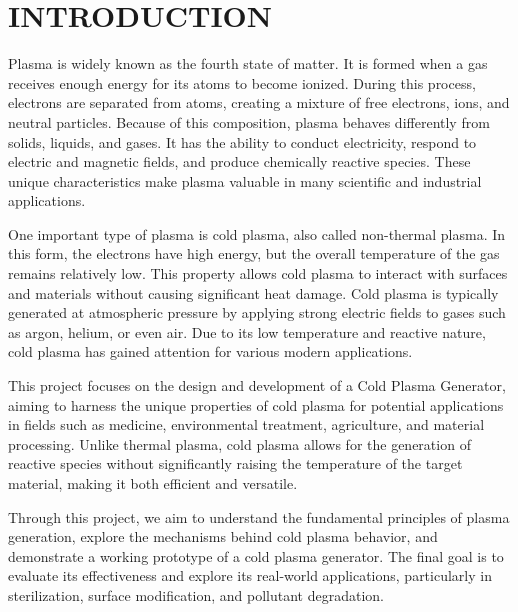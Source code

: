 \chapter{INTRODUCTION}\label{chap-intro}
\thispagestyle{empty}

\hspace{1cm} Plasma is widely known as the fourth state of matter. It is formed when a gas receives enough energy for its atoms to become ionized. During this process, electrons are separated from atoms, creating a mixture of free electrons, ions, and neutral particles. Because of this composition, plasma behaves differently from solids, liquids, and gases. It has the ability to conduct electricity, respond to electric and magnetic fields, and produce chemically reactive species. These unique characteristics make plasma valuable in many scientific and industrial applications.

One important type of plasma is cold plasma, also called non-thermal plasma. In this form, the electrons have high energy, but the overall temperature of the gas remains relatively low. This property allows cold plasma to interact with surfaces and materials without causing significant heat damage. Cold plasma is typically generated at atmospheric pressure by applying strong electric fields to gases such as argon, helium, or even air. Due to its low temperature and reactive nature, cold plasma has gained attention for various modern applications.

This project focuses on the design and development of a Cold Plasma Generator, aiming to harness the unique properties of cold plasma for potential applications in fields such as medicine, environmental treatment, agriculture, and material processing. Unlike thermal plasma, cold plasma allows for the generation of reactive species without significantly raising the temperature of the target material, making it both efficient and versatile.

Through this project, we aim to understand the fundamental principles of plasma generation, explore the mechanisms behind cold plasma behavior, and demonstrate a working prototype of a cold plasma generator. The final goal is to evaluate its effectiveness and explore its real-world applications, particularly in sterilization, surface modification, and pollutant degradation.  

